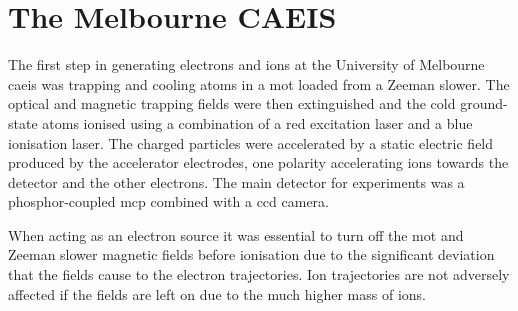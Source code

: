 \section{The Melbourne CAEIS}\label{section:apparatus}
The first step in generating electrons and ions at the University of Melbourne \gls{caeis} was trapping and cooling atoms in a \gls{mot} loaded from a Zeeman slower.
The optical and magnetic trapping fields were then extinguished and the cold ground-state atoms ionised using a combination of a red excitation laser and a blue ionisation laser.
The charged particles were accelerated by a static electric field produced by the accelerator electrodes, one polarity accelerating ions towards the detector and the other electrons.
The main detector for experiments was a phosphor-coupled \gls{mcp} combined with a \gls{ccd} camera.

When acting as an electron source it was essential to turn off the \gls{mot} and Zeeman slower magnetic fields before ionisation due to the significant deviation that the fields cause to the electron trajectories.
Ion trajectories are not adversely affected if the fields are left on due to the much higher mass of ions.

